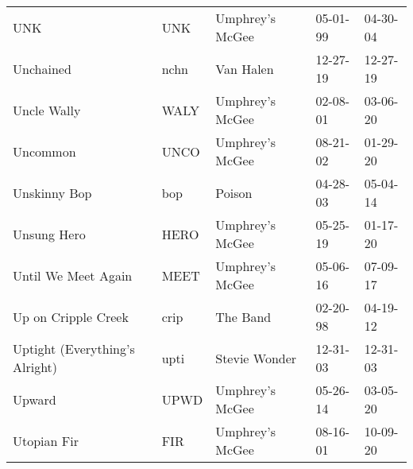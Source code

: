 \begin{longtable}{p{}p{}p{}p{}p{}}
                                                                     UNK &           UNK &                                          Umphrey's McGee &              05-01-99 &             04-30-04 \\
                                                               Unchained &          nchn &                                                Van Halen &              12-27-19 &             12-27-19 \\
                                                             Uncle Wally &          WALY &                                          Umphrey's McGee &              02-08-01 &             03-06-20 \\
                                                                Uncommon &          UNCO &                                          Umphrey's McGee &              08-21-02 &             01-29-20 \\
                                                            Unskinny Bop &           bop &                                                   Poison &              04-28-03 &             05-04-14 \\
                                                             Unsung Hero &          HERO &                                          Umphrey's McGee &              05-25-19 &             01-17-20 \\
                                                     Until We Meet Again &          MEET &                                          Umphrey's McGee &              05-06-16 &             07-09-17 \\
                                                     Up on Cripple Creek &          crip &                                                 The Band &              02-20-98 &             04-19-12 \\
                                          Uptight (Everything's Alright) &          upti &                                            Stevie Wonder &              12-31-03 &             12-31-03 \\
                                                                  Upward &          UPWD &                                          Umphrey's McGee &              05-26-14 &             03-05-20 \\
                                                             Utopian Fir &           FIR &                                          Umphrey's McGee &              08-16-01 &             10-09-20 \\

\end{longtable}
